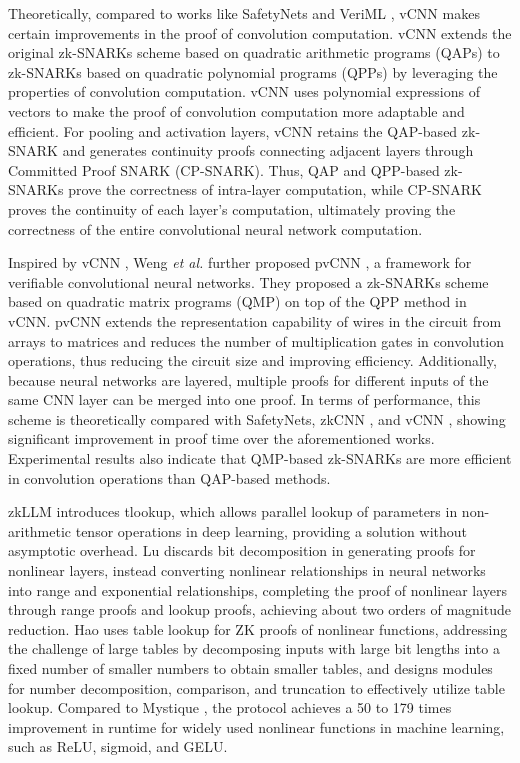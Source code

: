 \documentclass[journal]{IEEEtran}
\begin{document}
Theoretically, compared to works like SafetyNets \cite{ghodsi2017safetynets} and VeriML \cite{zhao2021veriml}, vCNN \cite{lee2024vcnn} makes certain improvements in the proof of convolution computation. vCNN \cite{lee2024vcnn} extends the original zk-SNARKs scheme based on quadratic arithmetic programs (QAPs) to zk-SNARKs based on quadratic polynomial programs (QPPs) by leveraging the properties of convolution computation. vCNN \cite{lee2024vcnn} uses polynomial expressions of vectors to make the proof of convolution computation more adaptable and efficient. For pooling and activation layers, vCNN \cite{lee2024vcnn} retains the QAP-based zk-SNARK and generates continuity proofs connecting adjacent layers through Committed Proof SNARK (CP-SNARK). Thus, QAP and QPP-based zk-SNARKs prove the correctness of intra-layer computation, while CP-SNARK proves the continuity of each layer's computation, ultimately proving the correctness of the entire convolutional neural network computation.

Inspired by vCNN \cite{lee2024vcnn}, Weng \emph{et al.} further proposed pvCNN \cite{weng2023pvcnn}, a framework for verifiable convolutional neural networks. They proposed a zk-SNARKs scheme based on quadratic matrix programs (QMP) on top of the QPP method in vCNN. pvCNN \cite{weng2023pvcnn} extends the representation capability of wires in the circuit from arrays to matrices and reduces the number of multiplication gates in convolution operations, thus reducing the circuit size and improving efficiency. Additionally, because neural networks are layered, multiple proofs for different inputs of the same CNN layer can be merged into one proof. In terms of performance, this scheme is theoretically compared with SafetyNets\cite{ghodsi2017safetynets}, zkCNN \cite{liu2021zkcnn}, and vCNN \cite{lee2024vcnn}, showing significant improvement in proof time over the aforementioned works. Experimental results also indicate that QMP-based zk-SNARKs are more efficient in convolution operations than QAP-based methods.

zkLLM \cite{sun2024zkllm}  introduces tlookup, which allows parallel lookup of parameters in non-arithmetic tensor operations in deep learning, providing a solution without asymptotic overhead. Lu \cite{lu2024efficient} discards bit decomposition in generating proofs for nonlinear layers, instead converting nonlinear relationships in neural networks into range and exponential relationships, completing the proof of nonlinear layers through range proofs and lookup proofs, achieving about two orders of magnitude reduction. Hao \cite{hao2024scalable} uses table lookup for ZK proofs of nonlinear functions, addressing the challenge of large tables by decomposing inputs with large bit lengths into a fixed number of smaller numbers to obtain smaller tables, and designs modules for number decomposition, comparison, and truncation to effectively utilize table lookup. Compared to Mystique \cite{weng2021mystique}, the protocol achieves a 50 to 179 times improvement in runtime for widely used nonlinear functions in machine learning, such as ReLU, sigmoid, and GELU.
\end{document}
